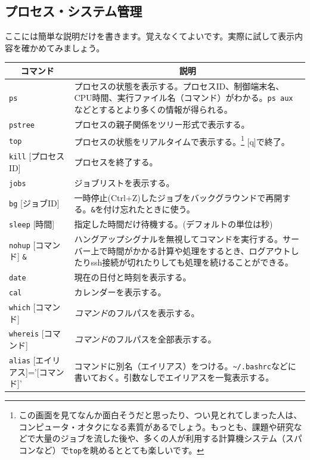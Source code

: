 \documentclass[a4j]{ltjreport}
\begin{document}
    \subsection{プロセス・システム管理}
    ここには簡単な説明だけを書きます。覚えなくてよいです。実際に試して表示内容を確かめてみましょう。
    \begin{longtable}[c]{|p{3.5cm}|p{13.5cm}|}
        \hline
        \multicolumn{1}{|c|}{\textbf{コマンド}}&\multicolumn{1}{|c|}{\textbf{説明}}\\
        \hline\hline
        \texttt{ps}&プロセスの状態を表示する。プロセスID、制御端末名、CPU時間、実行ファイル名（コマンド）がわかる。\texttt{ps aux}などとするとより多くの情報が得られる。\\
        \hline
        \texttt{pstree}&プロセスの親子関係をツリー形式で表示する。\\
        \hline
        \texttt{top} &プロセスの状態をリアルタイムで表示する。\footnote{この画面を見てなんか面白そうだと思ったり、つい見とれてしまった人は、コンピュータ・オタクになる素質があるでしょう。もっとも、課題や研究などで大量のジョブを流した後や、多くの人が利用する計算機システム（スパコンなど）で\texttt{top}を眺めるととても楽しいです。} [q]で終了。\\
        \hline
        \texttt{kill} [プロセスID]&プロセスを終了する。\\
        \hline
        \texttt{jobs} &ジョブリストを表示する。\\
        \hline
        \texttt{bg} [ジョブID]&一時停止(Ctrl+Z)したジョブをバックグラウンドで再開する。\texttt{\&}を付け忘れたときに使う。 \\
        \hline
        \texttt{sleep} [時間]&指定した時間だけ待機する。(デフォルトの単位は秒)\\
        \hline
        \texttt{nohup} [コマンド] \texttt{\&} &ハングアップシグナルを無視してコマンドを実行する。サーバー上で時間がかかる計算や処理をするとき、ログアウトしたりssh接続が切れたりしても処理を続けることができる。\\
        \hline
        \texttt{date} &現在の日付と時刻を表示する。\\
        \hline
        \texttt{cal} &カレンダーを表示する。\\
        \hline
        \texttt{which} [コマンド] &\emph{コマンド}のフルパスを表示する。\\
        \hline
        \texttt{whereis} [コマンド] &\emph{コマンド}のフルパスを全部表示する。\\
        \hline
        \texttt{alias} {\small [エイリアス]='[コマンド]'} &コマンドに別名（エイリアス）をつける。\verb|~/.bashrc|などに書いておく。引数なしでエイリアスを一覧表示する。\\

\end{longtable}
\end{document}
